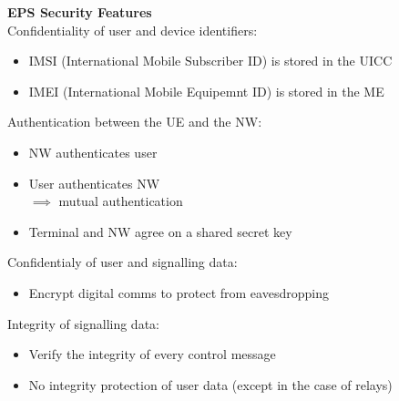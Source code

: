 \documentclass[10pt,letterpaper,landscape]{report}
\newcommand{\boxheight}{21.59cm}
\newcommand{\boxwidth}{8.85cm}
\begin{document}
\begin{small}
{\begin{minipage}[t][\boxheight][c]{\boxwidth}
    \textbf{EPS Security Features}\\
    Confidentiality of user and device identifiers:
    \begin{itemize}
        \item IMSI (International Mobile Subscriber ID) is stored in the UICC
        \item IMEI (International Mobile Equipemnt ID) is stored in the ME
    \end{itemize}
    Authentication between the UE and the NW:
    \begin{itemize}
        \item NW authenticates user
        \item User authenticates NW\\
        $\implies$ mutual authentication
        \item Terminal and NW agree on a shared secret key
    \end{itemize}
    Confidentialy of user and signalling data:
    \begin{itemize}
        \item Encrypt digital comms to protect from eavesdropping
    \end{itemize}
    Integrity of signalling data:
    \begin{itemize}
        \item Verify the integrity of every control message
        \item No integrity protection of user data (except in the case of relays)
    \end{itemize}
    

    
    

\end{minipage}
}\fbox{
\begin{minipage}[t][\boxheight][c]{\boxwidth}

    TODO


\end{minipage}
}
\end{small}
\end{document}
